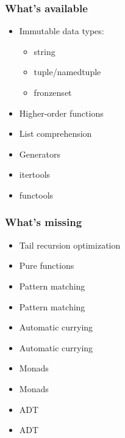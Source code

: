 \documentclass[18pt, compress, aspectratio=169]{beamer}
\def\fail{\textcolor{fail}{\FA \faRemove}}
\def\question{\textcolor{question}{\FA \faSearch}}
\begin{document}
\begin{frame}
    \frametitle{What's available}
    \vspace{-25pt}
    \begin{itemize}[label={\MVRightarrow}]
        \item <+->Immutable data types:
            \begin{itemize}
                \item string
                \item tuple/namedtuple
                \item fronzenset
            \end{itemize}
        \item <+->Higher-order functions
        \item <+->List comprehension
        \item <+->Generators
        \item <+->itertools
        \item <+->functools
    \end{itemize}
\end{frame}

\begin{frame}
    \frametitle{What's missing}
    \begin{overlayarea}{\textwidth}{.8\textheight}
    \begin{itemize}[label={\MVRightarrow}]
        \item <1->Tail recursion optimization \fail
        \item <2->Pure functions \fail
        \item <3|only@3>Pattern matching \alt<3>{\fail}{\question}
        \item <4->Pattern matching \alt<3>{\fail}{\question}
        \item <5|only@5>Automatic currying \alt<5>{\fail}{\question}
        \item <6->Automatic currying \alt<5>{\fail}{\question}
        \item <7|only@7>Monads \alt<7>{\fail}{\question}
        \item <8->Monads \alt<7>{\fail}{\question}
        \item <9|only@9>ADT \alt<9>{\fail}{\question}
        \item <10->ADT \alt<9>{\fail}{\question}
    \end{itemize}
    \end{overlayarea}
\end{frame}
\end{document}
